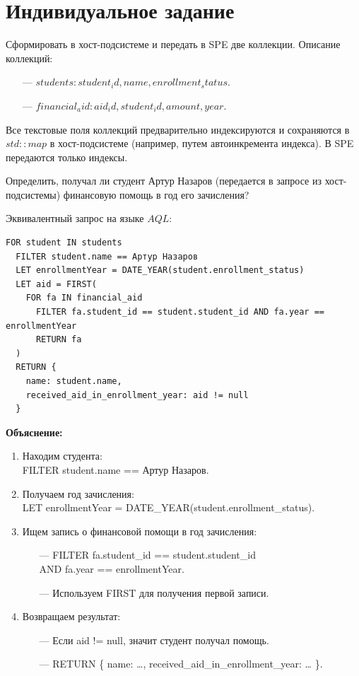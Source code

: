 \documentclass{article}
\begin{document}
\clearpage\section{Индивидуальное задание}

Сформировать в хост-подсистеме и передать в SPE две коллекции. Описание коллекций:

\begin{itemize}
	\item[---] $students: student_id, name, enrollment_status$.
	\item[---] $financial_aid: aid_id, student_id, amount, year$.
\end{itemize}

Все текстовые поля коллекций предварительно индексируются и сохраняются в $std::map$ в хост-подсистеме (например, путем 
автоинкремента индекса). В SPE передаются только индексы.

Определить, получал ли студент Артур Назаров (передается в запросе из хост-подсистемы) финансовую помощь в год его 
зачисления?

Эквивалентный запрос на языке $AQL$:

\begin{lstlisting}[style=lang, caption=Запрос на языке AQL]
FOR student IN students
  FILTER student.name == Артур Назаров
  LET enrollmentYear = DATE_YEAR(student.enrollment_status)
  LET aid = FIRST(
    FOR fa IN financial_aid
      FILTER fa.student_id == student.student_id AND fa.year == enrollmentYear
      RETURN fa
  )
  RETURN {
    name: student.name,
    received_aid_in_enrollment_year: aid != null
  }
\end{lstlisting}

\textbf{Объяснение:}

\begin{enumerate}
	\item Находим студента: \\FILTER student.name == Артур Назаров.
	\item Получаем год зачисления: \\ LET enrollmentYear = DATE\_YEAR(student.enrollment\_status).
	\item Ищем запись о финансовой помощи в год зачисления: 
	\begin{itemize}
		\item[---] FILTER fa.student\_id == student.student\_id \\AND fa.year == enrollmentYear.
		\item[---] Используем FIRST для получения первой записи.
	\end{itemize}
	\item Возвращаем результат:
	\begin{itemize}
		\item[---] Если aid != null, значит студент получал помощь.
		\item[---] RETURN \{ name: …, received\_aid\_in\_enrollment\_year: … \}.
	\end{itemize}
\end{enumerate}
\end{document}
